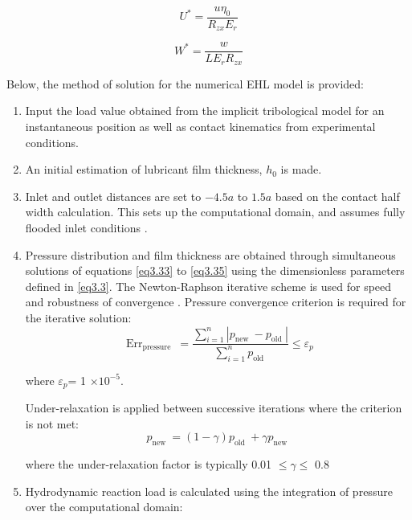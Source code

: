 \begin{equation}\label{eq3.37}
	U^*=\frac{u \eta_0}{R_{z x} E_r}
\end{equation}

\begin{equation}\label{eq3.38}
	W^*=\frac{w}{L E_r R_{z x}}
\end{equation}

Below, the method of solution for the numerical EHL model is provided:

\begin{enumerate} %
	\item Input the load value obtained from the implicit tribological model for an instantaneous position as well as contact kinematics from experimental conditions.
	\item An initial estimation of lubricant film thickness, $h_0$ is made.
	\item Inlet and outlet distances are set to $-4.5a$ to $1.5a$ based on the contact half width calculation. This sets up the computational domain, and assumes fully flooded inlet conditions \cite{Hamrock1976}. 
	\item Pressure distribution and film thickness are obtained through simultaneous solutions of equations \ref{eq3.33} to \ref{eq3.35} using the dimensionless parameters defined in \ref{eq3.3}. The Newton-Raphson iterative scheme is used for speed and robustness of convergence \cite{Okumara1982}. Pressure convergence criterion is required for the iterative solution:
	\begin{equation}\label{eq3.39}
		\operatorname{Err}_{\text {pressure }}=\frac{\sum_{i=1}^n\left|p_{\text {new }}-p_{\text {old }}\right|}{\sum_{i=1}^n p_{\text {old }}} \leq \varepsilon_p
	\end{equation}

	where $\varepsilon_p$= 1 $\times 10^{-5}$.
	
	Under-relaxation is applied between successive iterations where the criterion is not met:
	\begin{equation}\label{Under relaxation}
		p_{\text {new }}=(1-\gamma) p_{\text {old }}+\gamma p_{\text {new }}
	\end{equation}

	where the under-relaxation factor is typically 0.01 $\le\gamma\le$ 0.8
	
	\item Hydrodynamic reaction load is calculated using the integration of pressure over the computational domain:
	

\end{enumerate}
